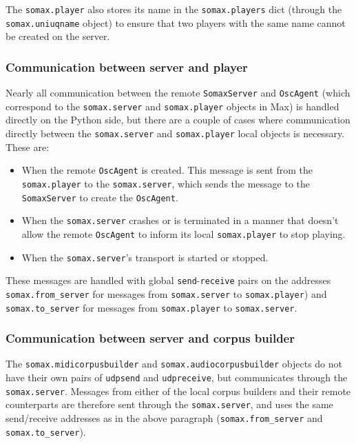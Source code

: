 The \texttt{somax.player} also stores its name in the \texttt{somax.players} dict (through the \texttt{somax.uniuqname} object)  to ensure that two players with the same name cannot be created on the server.

\subsubsection{Communication between server and player}
Nearly all communication between the remote \texttt{SomaxServer} and \texttt{OscAgent} (which correspond to the \texttt{somax.server} and \texttt{somax.player} objects in Max) is handled directly on the Python side, but there are a couple of cases where communication directly between the \texttt{somax.server} and \texttt{somax.player} local objects is necessary. These are:
\begin{itemize}
	\item When the remote \texttt{OscAgent} is created. This message is sent from the \texttt{somax.player} to the \texttt{somax.server}, which sends the message to the \texttt{SomaxServer} to create the \texttt{OscAgent}. 
	\item When the \texttt{somax.server} crashes or is terminated in a manner that doesn't allow the remote \texttt{OscAgent} to inform its local \texttt{somax.player} to stop playing.
	\item When the \texttt{somax.server}'s transport is started or stopped.
\end{itemize}

\noindent These messages are handled with global \texttt{send}-\texttt{receive} pairs on the addresses \texttt{somax.from\_server} for messages from \texttt{somax.server} to \texttt{somax.player}) and \texttt{somax.to\_server} for messages from \texttt{somax.player} to \texttt{somax.server}.


\subsubsection{Communication between server and corpus builder}

The \texttt{somax.midicorpusbuilder} and \texttt{somax.audiocorpusbuilder} objects do not have their own pairs of \texttt{udpsend} and \texttt{udpreceive}, but communicates through the \texttt{somax.server}. Messages from either of the local corpus builders and their remote counterparts are therefore sent through the \texttt{somax.server}, and uses the same send/receive addresses as in the above paragraph (\texttt{somax.from\_server} and \texttt{somax.to\_server}).


